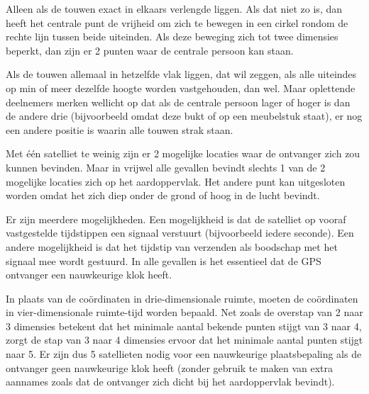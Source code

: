 \begin{Antwoord}{4.2}
		Alleen als de touwen exact in elkaars verlengde liggen. Als dat niet zo is, dan heeft het centrale punt de vrijheid om zich te bewegen in een cirkel rondom de rechte lijn tussen beide uiteinden. Als deze beweging zich tot twee dimensies beperkt, dan zijn er 2 punten waar de centrale persoon kan staan.
	
\end{Antwoord}
\begin{Antwoord}{4.3}
		Als de touwen allemaal in hetzelfde vlak liggen, dat wil zeggen, als alle uiteindes op min of meer dezelfde hoogte worden 	vastgehouden, dan wel. Maar oplettende deelnemers merken wellicht op dat als de centrale persoon lager of hoger is dan de 			andere drie (bijvoorbeeld omdat deze bukt of op een meubelstuk staat), er nog een andere positie is waarin alle touwen 				strak staan.
	
\end{Antwoord}
\begin{Antwoord}{4.11}
		Met \'e\'en satelliet te weinig zijn er 2 mogelijke locaties waar de ontvanger zich zou kunnen bevinden. Maar in vrijwel alle gevallen bevindt slechts 1 van de 2 mogelijke locaties zich op het aardoppervlak. Het andere punt kan uitgesloten worden omdat het zich diep onder de grond of hoog in de lucht bevindt.
	
\end{Antwoord}
\begin{Antwoord}{4.13}
		Er zijn meerdere mogelijkheden. Een mogelijkheid is dat de satelliet op vooraf vastgestelde tijdstippen een signaal verstuurt (bijvoorbeeld iedere seconde). Een andere mogelijkheid is dat het tijdstip van verzenden als boodschap met het signaal mee wordt gestuurd. In alle gevallen is het essentieel dat de GPS ontvanger een nauwkeurige klok heeft.
	
\end{Antwoord}
\begin{Antwoord}{4.15}
		In plaats van de co\"ordinaten in drie-dimensionale ruimte, moeten de co\"ordinaten in vier-dimensionale ruimte-tijd worden bepaald. Net zoals de overstap van 2 naar 3 dimensies betekent dat het minimale aantal bekende punten stijgt van 3 naar 4, zorgt de stap van 3 naar 4 dimensies ervoor dat het minimale aantal punten stijgt naar 5. Er zijn dus 5 satellieten nodig voor een nauwkeurige plaatsbepaling als de ontvanger geen nauwkeurige klok heeft (zonder gebruik te maken van extra aannames zoals dat de ontvanger zich dicht bij het aardoppervlak bevindt).
	
\end{Antwoord}

